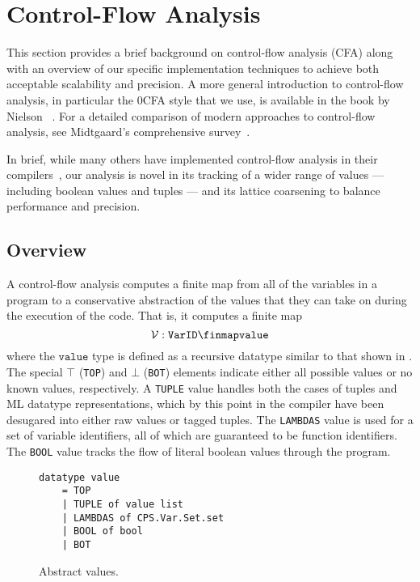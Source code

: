 %
\section{Control-Flow Analysis}
\label{sec:cfa}
This section provides a brief background on control-flow analysis (CFA) along with an overview 
of our specific implementation techniques to achieve both acceptable scalability and precision. 
A more general introduction to control-flow analysis, in particular the 0CFA
style that we use, is available in the book by Nielson \etal{}~\cite{principles-prog-analysis}.
For a detailed comparison of modern approaches to control-flow analysis, see Midtgaard's 
comprehensive survey~\cite{midtgaard-cfa-survey}. 

In brief, while many others have implemented control-flow analysis in their
compilers~\cite{serrano:cfa-paradigm,mlton-cfa,sub-zero-cfa}, our analysis is
novel in its tracking of a wider range of values --- including boolean values and 
tuples --- and its lattice coarsening to balance performance and precision.

\subsection{Overview}
A control-flow analysis computes a finite map from all of the variables in a program 
to a conservative abstraction of the values that they can take on during the
execution of the code.
That is, it computes a finite map 
\begin{displaymath}
 \mathcal{V} : \mathtt{VarID} \finmap \mathtt{value}
\end{displaymath}
where the $\mathtt{value}$ type is defined as a recursive datatype similar to
that shown in .
The special $\top$ (\lstinline{TOP}) and $\bot$ (\lstinline{BOT}) elements 
indicate either all possible values or no known values, respectively. 
A \lstinline{TUPLE} value handles both the cases of tuples and ML datatype
representations, which by this point in the compiler have been desugared into
either raw values or tagged tuples.
The \lstinline{LAMBDAS} value is used for a set of variable identifiers, all of
which are guaranteed to be function identifiers.
The \lstinline{BOOL} value tracks the flow of literal boolean values through
the program.
\begin{figure}[t]
\begin{lstlisting}[basicstyle=\ttfamily\scriptsize\color{\cdColor}]
  datatype value
    = TOP
    | TUPLE of value list
    | LAMBDAS of CPS.Var.Set.set
    | BOOL of bool
    | BOT
\end{lstlisting}
\caption{
  Abstract values.
}
\label{fig:values} 
\end{figure}%

